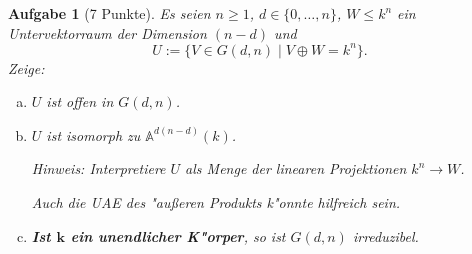 \documentclass[a4paper, 12pt, numbers=noendperiod, chapterprefix=true, headsepline]{scrbook}
\theoremstyle{break}
\newtheorem{Aufg}{Aufgabe}
\theoremstyle{nonumberbreak}
\theoremstyle{nonumberplain}
\newcommand{\A}{\mathbb{A}}
\begin{document}
\begin{Aufg}[7 Punkte]
Es seien $n \geq 1$, $d \in \{0,\dots, n\}$, $W \leq k^n$ ein Untervektorraum der Dimension $(n-d)$ und
	\[U := \{V \in G(d,n) \mid V \oplus W = k^n \}.\]
\emph{Zeige}:
\begin{enumerate}[a)]
	\item $U$ ist offen in $G(d,n)$.
	\item $U$ ist isomorph zu $\A^{d(n-d)}(k)$.
	
	\textit{Hinweis:} Interpretiere $U$ als Menge der linearen Projektionen $k^n \rightarrow W$.
	
	Auch die UAE des "au\ss eren Produkts k"onnte hilfreich sein.

	\item \textbf{Ist $\mathbf{k}$ ein unendlicher K"orper}, so ist $G(d,n)$ irreduzibel.
\end{enumerate}\end{Aufg}
\end{document}
